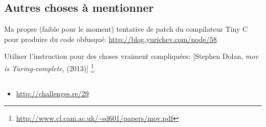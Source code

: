 \subsection{Autres choses à mentionner}

Ma propre (faible pour le moment) tentative de patch du compilateur Tiny C pour
produire du code obfusqué: \url{http://blog.yurichev.com/node/58}.

Utiliser l'instruction \MOV pour des choses vraiment compliquées:
[Stephen Dolan, \emph{mov is Turing-complete}, (2013)]
\footnote{\AlsoAvailableAs \url{http://www.cl.cam.ac.uk/~sd601/papers/mov.pdf}}. 

\subsection{\Exercise}

\begin{itemize}
	\item \url{http://challenges.re/29}
\end{itemize}

